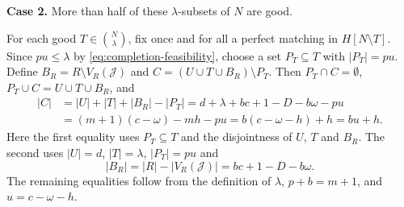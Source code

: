 \documentclass[10pt,a4paper]{article}
\numberwithin{equation}{section}
\theoremstyle{definition}
\begin{document}
\medskip\noindent\textbf{Case 2.} More than half of these $\lambda$-subsets of $N$ are good.
\medskip

For each good $T\in\binom N\lambda$, fix once and for all a perfect matching in $H[N\setminus T]$.
Since $pu\le\lambda$ by \eqref{eq:completion-feasibility}, choose a set $P_T\subseteq T$ with $|P_T|=pu$.
Define $B_R=R\setminus V_R(\mathcal J)$ and $C=(U\cup T\cup B_R)\setminus P_T$.
Then $P_T\cap C=\emptyset$, $P_T\cup C=U\cup T\cup B_R$, and
\[
        \begin{aligned}
                |C| & =
                |U|+|T|+|B_R|-|P_T| =
                d+\lambda+bc+1-D-b\omega-pu \\
                    & =
                (m+1)(c-\omega)-mh-pu =
                b(c-\omega-h)+h
                =
                bu+h.
        \end{aligned}
\]
Here the first equality uses $P_T\subseteq T$ and the disjointness of
$U$, $T$ and $B_R$.
The second uses $|U|=d$, $|T|=\lambda$,
$|P_T|=pu$ and
\[
        |B_R|=|R|-|V_R(\mathcal J)|=bc+1-D-b\omega.
\]
The remaining equalities follow from the definition of $\lambda$, $p+b=m+1$, and $u=c-\omega-h$.
\end{document}
